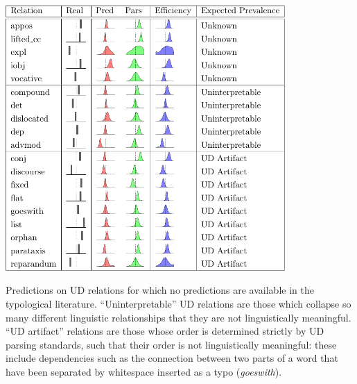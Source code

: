 \documentclass[10pt,twoside,lineno]{article}
\begin{document}





\begin{table} %
	\begin{center}	
\includegraphics[width=0.8\textwidth]{si-table-perrel-2a-1.png}  
\end{center}
\caption{Predictions on UD relations for which no predictions are available in the typological literature.  ``Uninterpretable'' UD relations are those which collapse so many different linguistic relationships that they are not linguistically meaningful. ``UD artifact'' relations are those whose order is determined strictly by UD parsing standards, such that their order is not linguistically meaningful: these include dependencies such as the connection between two parts of a word that have been separated by whitespace inserted as a typo (\emph{goeswith}).}
\label{tab:all-predictions-2}
\end{table}
\end{document}
